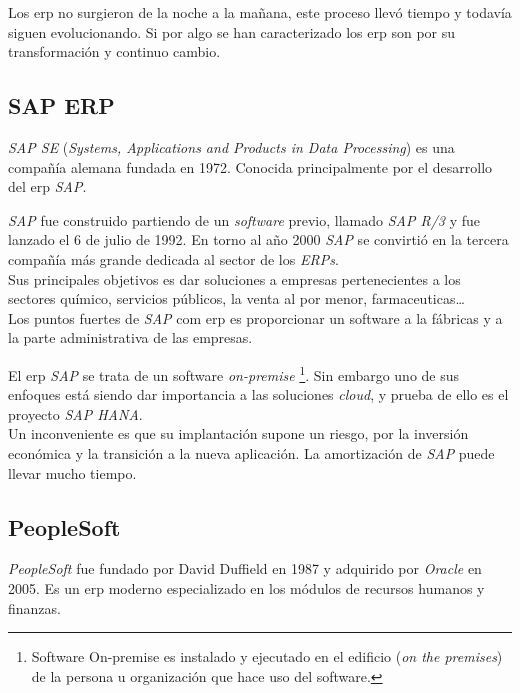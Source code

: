 Los \acrshort{erp} no surgieron de la noche a la mañana, este proceso llevó tiempo y todavía siguen evolucionando. Si por algo se han caracterizado los \acrshort{erp} son por su transformación y continuo cambio.


\subsection{SAP ERP}


\textit{SAP SE} (\textit{Systems, Applications and Products in Data Processing}) es una compañía alemana fundada en 1972. Conocida principalmente por el desarrollo del \acrshort{erp} \textit{SAP}.

\textit{SAP} fue construido partiendo de un \textit{software} previo, llamado \textit{SAP R/3} y fue lanzado el 6 de julio de 1992.
En torno al año 2000 \textit{SAP} se convirtió en la tercera compañía más grande dedicada al sector de los \textit{ERPs}.\\

Sus principales objetivos es dar soluciones a empresas pertenecientes a los sectores químico, servicios públicos, la venta al por menor, farmaceuticas\ldots\\

Los puntos fuertes de \textit{SAP} com \acrshort{erp} es proporcionar un software a la fábricas y a la parte administrativa de las empresas.

El \acrshort{erp} \textit{SAP} se trata de un software \textit{on-premise} \footnote{Software On-premise es instalado y ejecutado en el edificio (\textit{on the premises}) de la persona u organización que hace uso del software.}.
Sin embargo uno de sus enfoques está siendo dar importancia a las soluciones \textit{cloud}, y prueba de ello es el proyecto \textit{SAP HANA}.\\



Un inconveniente es que su implantación supone un riesgo, por la inversión económica y la transición a la nueva aplicación. La amortización de \textit{SAP} puede llevar mucho tiempo.

\subsection{PeopleSoft}
\textit{PeopleSoft} fue fundado por David Duffield en 1987 y adquirido por \textit{Oracle} en 2005. Es un \acrshort{erp} moderno especializado en los módulos de recursos humanos y finanzas.\\

